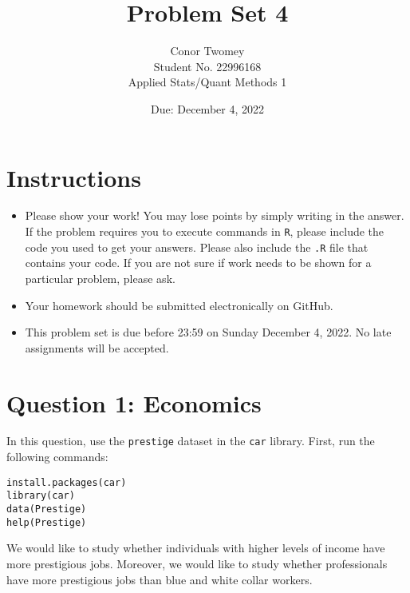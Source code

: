 \documentclass[12pt,letterpaper]{article}
\title{Problem Set 4}
\date{Due: December 4, 2022}
\author{Conor Twomey\\ Student No. 22996168\\
	Applied Stats/Quant Methods 1}
\begin{document}
	\maketitle
	\section*{Instructions}
	\begin{itemize}
		\item Please show your work! You may lose points by simply writing in the answer. If the problem requires you to execute commands in \texttt{R}, please include the code you used to get your answers. Please also include the \texttt{.R} file that contains your code. If you are not sure if work needs to be shown for a particular problem, please ask.
		\item Your homework should be submitted electronically on GitHub.
		\item This problem set is due before 23:59 on Sunday December 4, 2022. No late assignments will be accepted.
	\end{itemize}



	\vspace{.5cm}
\section*{Question 1: Economics}
\vspace{.25cm}
\noindent 	
In this question, use the \texttt{prestige} dataset in the \texttt{car} library. First, run the following commands:

\begin{verbatim}
install.packages(car)
library(car)
data(Prestige)
help(Prestige)
\end{verbatim} 


\noindent We would like to study whether individuals with higher levels of income have more prestigious jobs. Moreover, we would like to study whether professionals have more prestigious jobs than blue and white collar workers.
\end{document}
